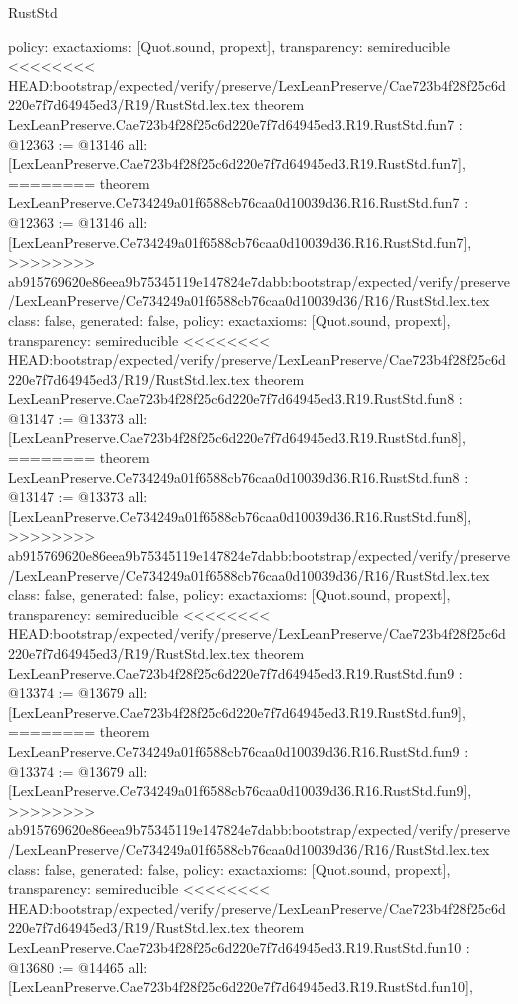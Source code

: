 \begin{lexlean}{RustStd}
\begin{coremodule}
{\begin{coremodule}
{{{{{{{{{{  policy: exact{axioms: [Quot.sound, propext]},
  transparency: semireducible
}
<<<<<<<< HEAD:bootstrap/expected/verify/preserve/LexLeanPreserve/Cae723b4f28f25c6d220e7f7d64945ed3/R19/RustStd.lex.tex
theorem LexLeanPreserve.Cae723b4f28f25c6d220e7f7d64945ed3.R19.RustStd.fun7 : @12363 := @13146 {
  all: [LexLeanPreserve.Cae723b4f28f25c6d220e7f7d64945ed3.R19.RustStd.fun7],
========
theorem LexLeanPreserve.Ce734249a01f6588cb76caa0d10039d36.R16.RustStd.fun7 : @12363 := @13146 {
  all: [LexLeanPreserve.Ce734249a01f6588cb76caa0d10039d36.R16.RustStd.fun7],
>>>>>>>> ab915769620e86eea9b75345119e147824e7dabb:bootstrap/expected/verify/preserve/LexLeanPreserve/Ce734249a01f6588cb76caa0d10039d36/R16/RustStd.lex.tex
  class: false,
  generated: false,
  policy: exact{axioms: [Quot.sound, propext]},
  transparency: semireducible
}
<<<<<<<< HEAD:bootstrap/expected/verify/preserve/LexLeanPreserve/Cae723b4f28f25c6d220e7f7d64945ed3/R19/RustStd.lex.tex
theorem LexLeanPreserve.Cae723b4f28f25c6d220e7f7d64945ed3.R19.RustStd.fun8 : @13147 := @13373 {
  all: [LexLeanPreserve.Cae723b4f28f25c6d220e7f7d64945ed3.R19.RustStd.fun8],
========
theorem LexLeanPreserve.Ce734249a01f6588cb76caa0d10039d36.R16.RustStd.fun8 : @13147 := @13373 {
  all: [LexLeanPreserve.Ce734249a01f6588cb76caa0d10039d36.R16.RustStd.fun8],
>>>>>>>> ab915769620e86eea9b75345119e147824e7dabb:bootstrap/expected/verify/preserve/LexLeanPreserve/Ce734249a01f6588cb76caa0d10039d36/R16/RustStd.lex.tex
  class: false,
  generated: false,
  policy: exact{axioms: [Quot.sound, propext]},
  transparency: semireducible
}
<<<<<<<< HEAD:bootstrap/expected/verify/preserve/LexLeanPreserve/Cae723b4f28f25c6d220e7f7d64945ed3/R19/RustStd.lex.tex
theorem LexLeanPreserve.Cae723b4f28f25c6d220e7f7d64945ed3.R19.RustStd.fun9 : @13374 := @13679 {
  all: [LexLeanPreserve.Cae723b4f28f25c6d220e7f7d64945ed3.R19.RustStd.fun9],
========
theorem LexLeanPreserve.Ce734249a01f6588cb76caa0d10039d36.R16.RustStd.fun9 : @13374 := @13679 {
  all: [LexLeanPreserve.Ce734249a01f6588cb76caa0d10039d36.R16.RustStd.fun9],
>>>>>>>> ab915769620e86eea9b75345119e147824e7dabb:bootstrap/expected/verify/preserve/LexLeanPreserve/Ce734249a01f6588cb76caa0d10039d36/R16/RustStd.lex.tex
  class: false,
  generated: false,
  policy: exact{axioms: [Quot.sound, propext]},
  transparency: semireducible
}
<<<<<<<< HEAD:bootstrap/expected/verify/preserve/LexLeanPreserve/Cae723b4f28f25c6d220e7f7d64945ed3/R19/RustStd.lex.tex
theorem LexLeanPreserve.Cae723b4f28f25c6d220e7f7d64945ed3.R19.RustStd.fun10 : @13680 := @14465 {
  all: [LexLeanPreserve.Cae723b4f28f25c6d220e7f7d64945ed3.R19.RustStd.fun10],
}}}}}}}}}}}}}
\end{coremodule}}
\end{coremodule}
\end{lexlean}
